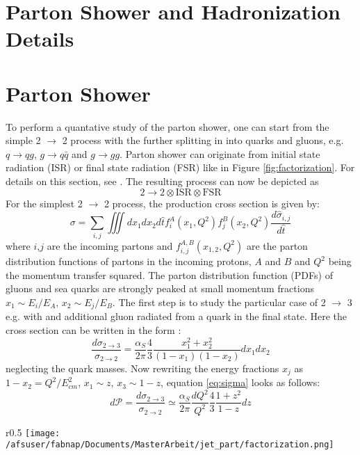 \section{Parton Shower and Hadronization Details}
\section{Parton Shower}
To perform a quantative study of the parton shower, one can start from the simple 2 $\to$ 2 process with the further splitting in into quarks and gluons, e.g. $q\to qg$, $g\to q\bar{q}$ and $g\to gg$. Parton shower can originate from initial state radiation (ISR) or final state radiation (FSR) like in Figure \ref{fig:factorization}. For details on this section, see \cite{partonshower}. 
The resulting process can now be depicted as $$2 \to 2 \otimes \textrm{ISR} \otimes \textrm{FSR}$$   
For the simplest 2 $\to$ 2 process, the production cross section is given by:
$$\sigma = \sum_{i,j}\iiint dx_1 dx_2 d\hat t f_i^A(x_1,Q^2)f_j^B(x_2,Q^2)\frac{d\hat{\sigma}_{i,j}}{d\hat{t}} $$
where $i$,$j$ are the incoming partons and $f_{i,j}^{A,B}(x_{1,2},Q^2)$ are the parton distribution functions of partons in the incoming protons, $A$ and $B$ and $Q^2$ being the momentum transfer squared.
The parton distribution function (PDFs) of gluons and sea quarks are strongly peaked at small momentum fractions $x_1 \sim E_i/E_A$, $x_2 \sim E_j/E_B$.  
The first step is to study the particular case of 2 $\to$ 3 e.g. with and additional gluon radiated from a quark in the final state.
Here the cross section can be written in the form \cite{halzenmartin}:
\begin{equation}
\frac{d\sigma_{2\to3}}{\sigma_{2\to2}}=\frac{\alpha_S}{2\pi}\frac{4}{3}\frac{x_1^2+x_2^2}{(1-x_1)(1-x_2)}dx_1dx_2
\end{equation}
\label{eq:sigma}
neglecting the quark masses. Now rewriting the energy fractions $x_j$ as $1-x_2=Q^2/E_{cm}^2$, $x_1\sim z$, $x_3 \sim 1-z$, equation \ref{eq:sigma} looks as follows:
$$d\mathcal{P}=\frac{d\sigma_{2\to3}}{\sigma_{2\to2}}\simeq \frac{\alpha_S}{2\pi} \frac{dQ^2}{Q^2}\frac{4}{3}\frac{1+z^2}{1-z}dz$$
\begin{wrapfigure}{r}{0.5\textwidth}
  \centering
      \texttt{[image: /afsuser/fabnap/Documents/MasterArbeit/jet\_part/factorization.png]}
  \caption{Example of factorization of 2$\to n$ process.}
  \label{fig:factorization}
\end{wrapfigure}

